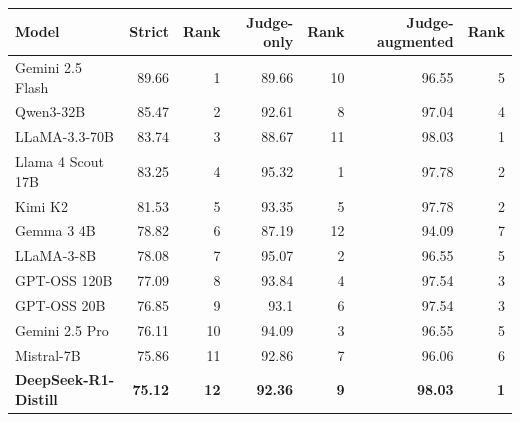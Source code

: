 \begin{tabular}{lrrrrrr}
\toprule
Model & Strict & Rank & Judge-only & Rank & Judge-augmented & Rank \\
\midrule
Gemini 2.5 Flash & 89.66 & 1 & 89.66 & 10 & 96.55 & 5 \\
Qwen3-32B & 85.47 & 2 & 92.61 & 8 & 97.04 & 4 \\
LLaMA-3.3-70B & 83.74 & 3 & 88.67 & 11 & 98.03 & 1 \\
Llama 4 Scout 17B & 83.25 & 4 & 95.32 & 1 & 97.78 & 2 \\
Kimi K2 & 81.53 & 5 & 93.35 & 5 & 97.78 & 2 \\
Gemma 3 4B & 78.82 & 6 & 87.19 & 12 & 94.09 & 7 \\
LLaMA-3-8B & 78.08 & 7 & 95.07 & 2 & 96.55 & 5 \\
GPT-OSS 120B & 77.09 & 8 & 93.84 & 4 & 97.54 & 3 \\
GPT-OSS 20B & 76.85 & 9 & 93.1 & 6 & 97.54 & 3 \\
Gemini 2.5 Pro & 76.11 & 10 & 94.09 & 3 & 96.55 & 5 \\
Mistral-7B & 75.86 & 11 & 92.86 & 7 & 96.06 & 6 \\
\textbf{DeepSeek-R1-Distill} & \textbf{75.12} & \textbf{12} & \textbf{92.36} & \textbf{9} & \textbf{98.03} & \textbf{1} \\
\bottomrule
\end{tabular}
